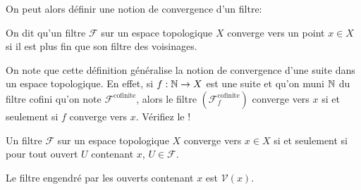 \documentclass{article}
\begin{document}
On peut alors définir une notion de convergence d'un filtre:
\begin{definition}
    On dit qu'un filtre $\mathcal{F}$ sur un espace topologique $X$ converge vers un point $x \in X$ si il est plus fin que son filtre des voisinages.
\end{definition}

On note que cette définition généralise la notion de convergence d'une suite dans un espace topologique. En effet, si $f: \mathbb{N} \to X$ est une suite et qu'on muni $\mathbb{N}$ du filtre cofini qu'on note $\mathcal{F}^{\text{cofinite}}$, alors le filtre $(\mathcal{F}_f^{\text{cofinite}})$ converge vers $x$ si et seulement si $f$ converge vers $x$. Vérifiez le !\\

\begin{proposition}
    Un filtre $\mathcal{F}$ sur un espace topologique $X$ converge vers $x \in X$ si et seulement si pour tout ouvert $U$ contenant $x$, $U \in \mathcal{F}$.
\end{proposition}

\begin{preuve}
    Le filtre engendré par les ouverts contenant $x$ est $\mathcal{V}(x)$.\\
\end{preuve}
\end{document}
